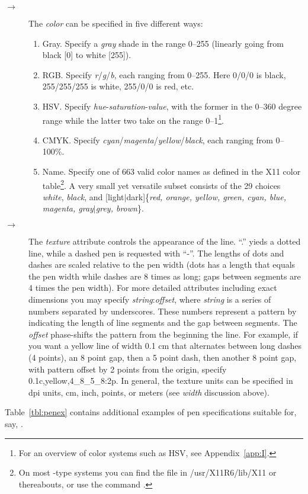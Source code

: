 \begin{description}
%
\item[$\rightarrow$]The \emph{color} can be specified in five different ways:
\begin{enumerate}
\item Gray. Specify a \emph{gray} shade in the range 0--255 (linearly going from black [0] to white [255]).
\item RGB. Specify \emph{r}/\emph{g}/\emph{b}, each ranging from 0--255.  Here 0/0/0 is black, 255/255/255 is white,
255/0/0 is red, etc.
\item HSV. Specify \emph{hue}-\emph{saturation}-\emph{value}, with the former in the 0--360 degree range while the latter
two take on the range 0--1\footnote{For an overview of color systems such as HSV, see Appendix~\ref{app:I}.}.
\item CMYK. Specify \emph{cyan}/\emph{magenta}/\emph{yellow}/\emph{black}, each ranging from 0--100\%.
\item Name.  Specify one of 663 valid color names as defined in the X11 color table\footnote{On most \UNIX-type systems
you can find the file  in /usr/X11R6/lib/X11 or thereabouts, or use the command .}.
A very small yet versatile subset consists of the 29 choices \emph{white}, \emph{black}, and
[light$|$dark]\{\emph{red,
orange, yellow, green, cyan, blue, magenta, gray$|$grey, brown}\}.
\end{enumerate}

%
\item[$\rightarrow$]The \emph{texture} attribute controls the appearance
of the line.  ``.'' yieds a dotted line, while a dashed pen is requested with ``-''.
The lengths of dots and dashes are scaled relative to the pen width (dots has
a length that equals the pen width while dashes are 8 times as long; gaps between
segments are 4 times the pen width).
For more detailed attributes including exact dimensions you may specify \emph{string}:\emph{offset},
where \emph{string} is a series of numbers separated by underscores.
These numbers represent a pattern by indicating the length of line
segments and the gap between segments.  The \emph{offset} phase-shifts the
pattern from the beginning the line.  For example, if you want a yellow line of width
0.1 cm that alternates between long dashes (4 points), an 8 point gap, then
a 5 point dash, then another 8 point gap, with pattern offset by 2 points
from the origin, specify 0.1c,yellow,4\_8\_5\_8:2p.
In general, the texture units can be specified in dpi units, cm, inch, points,
or meters (see \emph{width} discussion above). 
\end{description} 
Table~\ref{tbl:penex} contains additional examples of pen specifications suitable for, say, .

